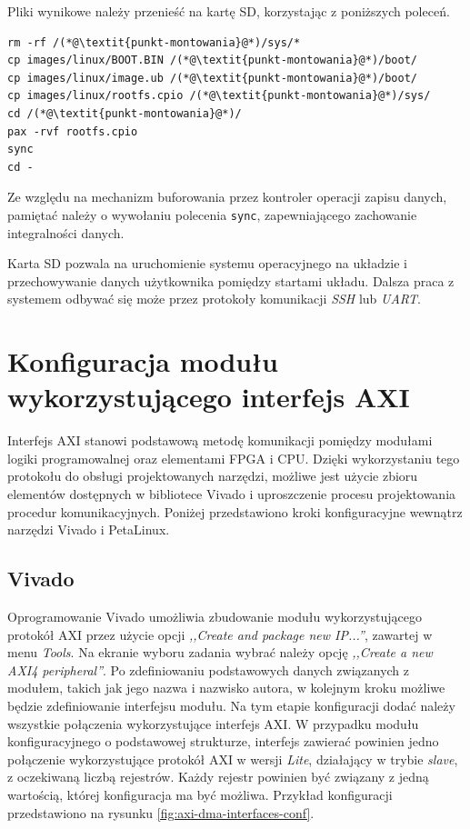 Pliki wynikowe należy przenieść na kartę SD, korzystając z poniższych poleceń.

\begin{lstlisting}[breaklines=true]
rm -rf /(*@\textit{punkt-montowania}@*)/sys/*
cp images/linux/BOOT.BIN /(*@\textit{punkt-montowania}@*)/boot/
cp images/linux/image.ub /(*@\textit{punkt-montowania}@*)/boot/
cp images/linux/rootfs.cpio /(*@\textit{punkt-montowania}@*)/sys/
cd /(*@\textit{punkt-montowania}@*)/
pax -rvf rootfs.cpio
sync
cd -
\end{lstlisting}

Ze względu na mechanizm buforowania przez kontroler operacji zapisu danych, pamiętać należy o wywołaniu polecenia \texttt{sync}, zapewniającego zachowanie integralności danych.

Karta SD pozwala na uruchomienie systemu operacyjnego na układzie i przechowywanie danych użytkownika pomiędzy startami układu. 
Dalsza praca z systemem odbywać się może przez protokoły komunikacji \emph{SSH} lub \emph{UART}.

\section{Konfiguracja modułu wykorzystującego interfejs AXI}
\label{sec:vivado-axi-dma}

Interfejs AXI stanowi podstawową metodę komunikacji pomiędzy modułami logiki programowalnej oraz elementami FPGA i CPU. Dzięki wykorzystaniu tego protokołu do obsługi projektowanych narzędzi, możliwe jest użycie zbioru elementów dostępnych w bibliotece Vivado i uproszczenie procesu projektowania procedur komunikacyjnych. Poniżej przedstawiono kroki konfiguracyjne wewnątrz narzędzi Vivado i PetaLinux.

\subsection{Vivado}
Oprogramowanie Vivado umożliwia zbudowanie modułu wykorzystującego protokół AXI przez użycie opcji \emph{,,Create and package new IP...''}, zawartej w menu \emph{Tools}.
Na ekranie wyboru zadania wybrać należy opcję \emph{,,Create a new AXI4 peripheral''}.
Po zdefiniowaniu podstawowych danych związanych z modułem, takich jak jego nazwa i nazwisko autora, w kolejnym kroku możliwe będzie zdefiniowanie interfejsu modułu. 
Na tym etapie konfiguracji dodać należy wszystkie połączenia wykorzystujące interfejs AXI. %
W przypadku modułu konfiguracyjnego o podstawowej strukturze, interfejs zawierać powinien jedno połączenie wykorzystujące protokół AXI w wersji \emph{Lite}, działający w trybie \emph{slave}, z oczekiwaną liczbą rejestrów. 
Każdy rejestr powinien być związany z jedną wartością, której konfiguracja ma być możliwa. 
Przykład konfiguracji przedstawiono na rysunku \ref{fig:axi-dma-interfaces-conf}.

